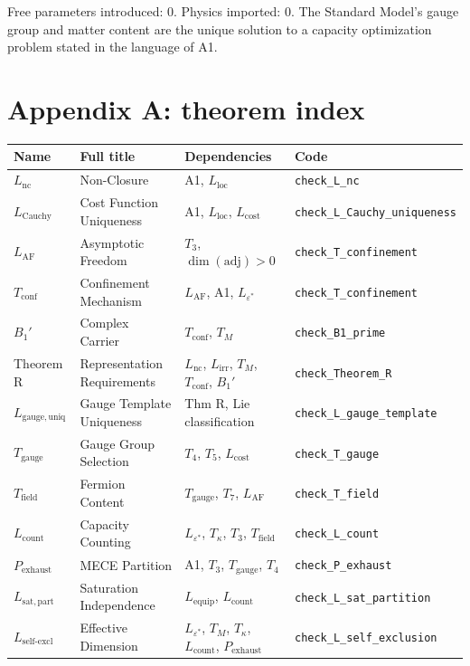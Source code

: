 \documentclass[11pt]{article}
\begin{document}
Free parameters introduced: 0.  Physics imported: 0.  The Standard Model's gauge group and matter content are the unique solution to a capacity optimization problem stated in the language of A1.


\section{Appendix A: theorem index}
\label{app:theorems}

\begin{center}
\footnotesize
\begin{tabular}{lp{3.5cm}p{4cm}l}
\toprule
\textbf{Name} & \textbf{Full title} & \textbf{Dependencies} & \textbf{Code} \\
\midrule
$L_{\mathrm{nc}}$ & Non-Closure & A1, $L_{\mathrm{loc}}$ & \texttt{check\_L\_nc} \\
$L_{\mathrm{Cauchy}}$ & Cost Function Uniqueness & A1, $L_{\mathrm{loc}}$, $L_{\mathrm{cost}}$ & \texttt{check\_L\_Cauchy\_uniqueness} \\
$L_{\mathrm{AF}}$ & Asymptotic Freedom & $T_3$, $\dim(\mathrm{adj}) > 0$ & \texttt{check\_T\_confinement} \\
$T_{\mathrm{conf}}$ & Confinement Mechanism & $L_{\mathrm{AF}}$, A1, $L_{\varepsilon^*}$ & \texttt{check\_T\_confinement} \\
$B_1'$ & Complex Carrier & $T_{\mathrm{conf}}$, $T_M$ & \texttt{check\_B1\_prime} \\
Theorem R & Representation Requirements & $L_{\mathrm{nc}}$, $L_{\mathrm{irr}}$, $T_M$, $T_{\mathrm{conf}}$, $B_1'$ & \texttt{check\_Theorem\_R} \\
$L_{\mathrm{gauge,uniq}}$ & Gauge Template Uniqueness & Thm R, Lie classification & \texttt{check\_L\_gauge\_template} \\
$T_{\mathrm{gauge}}$ & Gauge Group Selection & $T_4$, $T_5$, $L_{\mathrm{cost}}$ & \texttt{check\_T\_gauge} \\
$T_{\mathrm{field}}$ & Fermion Content & $T_{\mathrm{gauge}}$, $T_7$, $L_{\mathrm{AF}}$ & \texttt{check\_T\_field} \\
$L_{\mathrm{count}}$ & Capacity Counting & $L_{\varepsilon^*}$, $T_\kappa$, $T_3$, $T_{\mathrm{field}}$ & \texttt{check\_L\_count} \\
$P_{\mathrm{exhaust}}$ & MECE Partition & A1, $T_3$, $T_{\mathrm{gauge}}$, $T_4$ & \texttt{check\_P\_exhaust} \\
$L_{\mathrm{sat,part}}$ & Saturation Independence & $L_{\mathrm{equip}}$, $L_{\mathrm{count}}$ & \texttt{check\_L\_sat\_partition} \\
$L_{\mathrm{self\text{-}excl}}$ & Effective Dimension & $L_{\varepsilon^*}$, $T_M$, $T_\kappa$, $L_{\mathrm{count}}$, $P_{\mathrm{exhaust}}$ & \texttt{check\_L\_self\_exclusion} \\
\bottomrule
\end{tabular}
\end{center}
\end{document}
